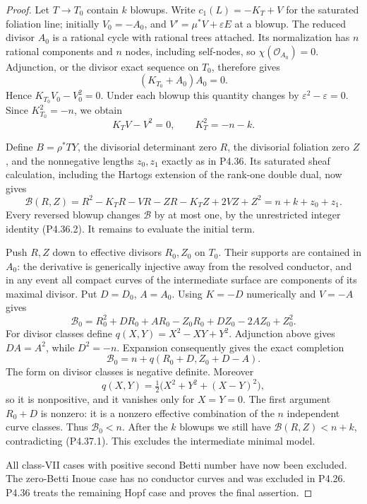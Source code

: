 \begin{proof}
Let $T\to T_0$ contain $k$ blowups. Write
$c_1(L)=-K_T+V$ for the saturated foliation line;
initially $V_0=-A_0$, and
$V'=\mu^*V+\varepsilon E$ at a blowup.
The reduced divisor $A_0$ is a rational cycle with
rational trees attached. Its normalization has
$n$ rational components and $n$ nodes, including
self-nodes, so $\chi(\mathcal O_{A_0})=0$.
Adjunction, or the divisor exact sequence on $T_0$,
therefore gives
\[
 (K_{T_0}+A_0)A_0=0.
\]
Hence $K_{T_0}V_0-V_0^2=0$.
Under each blowup this quantity changes by
$\varepsilon^2-\varepsilon=0$.
Since $K_{T_0}^2=-n$, we obtain
\[
 K_TV-V^2=0,\qquad K_T^2=-n-k.
\]

Define $B=\rho^*TY$, the divisorial determinant zero
$R$, the divisorial foliation zero $Z$, and the
nonnegative lengths $z_0,z_1$ exactly as in P4.36.
Its saturated sheaf calculation, including the
Hartogs extension of the rank-one double dual,
now gives
\[
 \mathcal B(R,Z)
 =R^2-K_TR-VR-ZR-K_TZ+2VZ+Z^2
 =n+k+z_0+z_1.                                  \tag{P4.37.1}
\]
Every reversed blowup changes $\mathcal B$ by at
most one, by the unrestricted integer identity
(P4.36.2). It remains to evaluate the initial term.

Push $R,Z$ down to effective divisors $R_0,Z_0$
on $T_0$. Their supports are contained in $A_0$:
the derivative is generically injective away from
the resolved conductor, and in any event all
compact curves of the intermediate surface are
components of its maximal divisor. Put $D=D_0$,
$A=A_0$. Using $K=-D$ numerically and $V=-A$ gives
\[
 \mathcal B_0
 =R_0^2+DR_0+AR_0-Z_0R_0+DZ_0-2AZ_0+Z_0^2.
\]
For divisor classes define
$q(X,Y)=X^2-XY+Y^2$.
Adjunction above gives $DA=A^2$, while $D^2=-n$.
Expansion consequently gives the exact completion
\[
 \mathcal B_0
       =n+q(R_0+D,Z_0+D-A).                     \tag{P4.37.2}
\]
The form on divisor classes is negative definite.
Moreover
\[
 q(X,Y)=\tfrac12\bigl(X^2+Y^2+(X-Y)^2\bigr),
\]
so it is nonpositive, and it vanishes only for
$X=Y=0$. The first argument $R_0+D$ is nonzero:
it is a nonzero effective combination of the
$n$ independent curve classes. Thus
$\mathcal B_0<n$.
After the $k$ blowups we still have
$\mathcal B(R,Z)<n+k$, contradicting (P4.37.1).
This excludes the intermediate minimal model.

All class-VII cases with positive second Betti
number have now been excluded. The zero-Betti
Inoue case has no conductor curves and was
excluded in P4.26. P4.36 treats the remaining
Hopf case and proves the final assertion.
\end{proof}
